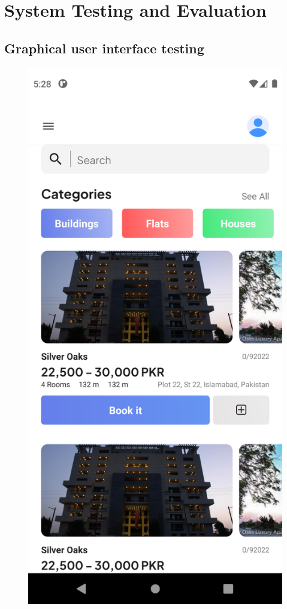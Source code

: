 \chapter{System Testing and Evaluation}\label{chap:testingEvaluation}


\section*{}
\section{Graphical user interface testing}
\begin{figure}[!htb]
	\begin{minipage}{0.48\textwidth}
		\centering
		\includegraphics[width=0.7\linewidth]{figures/Testing/scroll1.png}

\end{minipage}
\end{figure}
